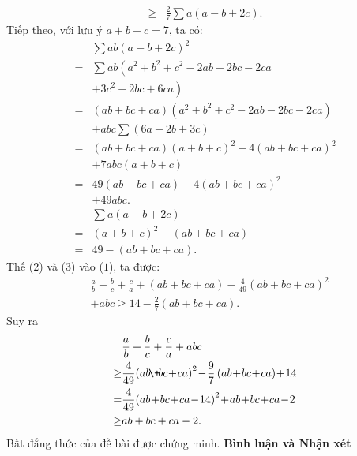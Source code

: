 \begin{multicols}{2}
\begin{align*}
		\ge &\frac{2}{7}\sum {a\left( {a - b + 2c} \right)}. \tag{$1$}
	\end{align*}
	Tiếp theo, với lưu ý $a + b + c = 7$, ta có:
	\begin{align*}
			&\sum {ab{{\left( {a - b + 2c} \right)}^2}} \\
			 = &\sum ab\left( {a^2} + {b^2} + {c^2} - 2ab - 2bc - 2ca\right. \\
			 		&\left.+ 3{c^2} - 2bc + 6ca \right)\\
			 = &\left( {ab \!+\! bc \!+\! ca} \right)\!\!\left(\! {{a^2} \!+\! {b^2} \!+\! {c^2} \!-\! 2ab \!-\! 2bc \!-\! 2ca} \!\right) \\
			 &+\! abc\sum {\left( {6a \!-\! 2b \!+\! 3c} \right)} \\
			 = &\left( {ab \!+\! bc \!+\! ca} \right)\!\!{\left( {a \!+\! b \!+\! c} \right)^2} \!-\! 4{\left( {ab \!+\! bc \!+\! ca} \right)^2} \\
			 &+\! 7abc\left( {a \!+\! b \!+\! c} \right)\\
			=& 49\left( {ab \!+\! bc \!+\! ca} \right) \!-\! 4{\left( {ab \!+\! bc \!+\! ca} \right)^2} \\
			&+\! 49abc. \tag{$2$}\\
		&\sum {a\left( {a - b + 2c} \right)}  \\
		= &{\left( {a + b + c} \right)^2} - \left( {ab + bc + ca} \right) \\
		= &49 - \left( {ab + bc + ca} \right). \tag{$3$}
	\end{align*}
	Thế ($2$) và ($3$) vào ($1$), ta được:
	\begin{align*}
		&\frac{a}{b} \!+\! \frac{b}{c} \!+\! \frac{c}{a} \!+\! \left( {ab \!+\! bc \!+\! ca} \right) \!-\! \frac{4}{{49}}{\left( {ab \!+\! bc \!+\! ca} \right)^2} \\
		&+\! abc \ge 14 \!-\! \frac{2}{7}\left( {ab \!+\! bc \!+\! ca} \right).
	\end{align*}
	Suy ra
	\begin{align*}
			&\frac{a}{b} + \frac{b}{c} + \frac{c}{a} + abc\\
			 \ge &\frac{4}{{49}}{\left( {ab \!\+\! bc \!+\! ca} \right)^2} \!-\! \frac{9}{7}\left( {ab \!+\! bc \!+\! ca} \right) \!+\! 14\\
			 = &\frac{4}{{49}}{\left( {ab \!+\! bc \!+\! ca \!-\! 14} \right)^2} \!+\! ab \!+\! bc \!+\! ca \!-\! 2\\
			 \ge &ab + bc + ca - 2.
	\end{align*}
	Bất đẳng thức của đề bài được chứng minh.
	\vskip 0.05cm
	\textbf{\color{thachthuctoanhoc}Bình luận và Nhận xét}

\end{multicols}
